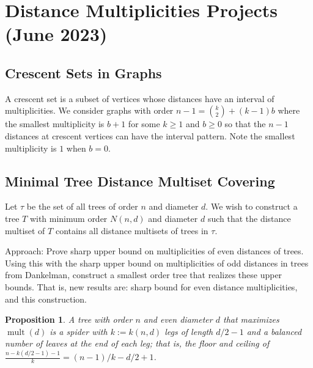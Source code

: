 \documentclass[12]{article}
\DeclareMathOperator{\mult}{mult}
\newtheorem{prop}[thm]{Proposition}
\theoremstyle{definition}
\begin{document}
	
	
	\newpage
	
	\section{Distance Multiplicities Projects (June 2023)}
	
	\subsection{Crescent Sets in Graphs}
	
	A crescent set is a subset of vertices whose distances have an interval of multiplicities.  We consider graphs with order $n-1 = {k \choose 2} + (k-1)b$ where the smallest multiplicity is $b+1$ for some $k \geq 1$ and $b \geq 0$ so that the $n-1$ distances at crescent vertices can have the interval pattern.  Note the smallest multiplicity is $1$ when $b = 0$.
	
	\subsection{Minimal Tree Distance Multiset Covering}
	
	Let $\tau$ be the set of all trees of order $n$ and diameter $d$.  We wish to construct a tree $T$ with minimum order $N(n,d)$ and diameter $d$ such that the distance multiset of $T$ contains all distance multisets of trees in $\tau$.
	
	Approach: Prove sharp upper bound on multiplicities of even distances of trees.  Using this with the sharp upper bound on multiplicities of odd distances in trees from Dankelman, construct a smallest order tree that realizes these upper bounds.  That is, new results are: sharp bound for even distance multiplicities, and this construction.
	
	\begin{prop}
		A tree with order $n$ and even diameter $d$ that maximizes $\mult(d)$ is a spider with $k := k(n,d)$ legs of length $d/2 -1$ and a balanced number of leaves at the end of each leg; that is, the floor and ceiling of $\frac{n - k(d/2-1) - 1}{k} = (n-1)/k - d/2 +1$.
	\end{prop}
\end{document}
